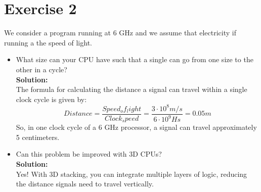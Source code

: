 \documentclass{report}
\begin{document}
\section*{Exercise 2}
We consider a program running at 6 GHz and we assume that electricity if running a the speed of
light.
\begin{itemize}
    \item
    {
        What size can your CPU have such that a single can go from one size to the other in a cycle?\\
        \textbf{Solution:}\\
        The formula for calculating the distance a signal can travel within a single clock cycle is given by: \[Distance = \frac{Speed_of_light}{Clock_speed} = \frac{3\cdot 10^8 m/s}{6\cdot 10^9Hs} = 0.05m\]
        So, in one clock cycle of a 6 GHz processor, a signal can travel approximately 5 centimeters.
    }
    \item
    {
        Can this problem be improved with 3D CPUs?\\
        \textbf{Solution:}\\
        Yes! With 3D stacking, you can integrate multiple layers of logic, reducing the distance signals need to travel vertically.
    }
\end{itemize}
\end{document}
